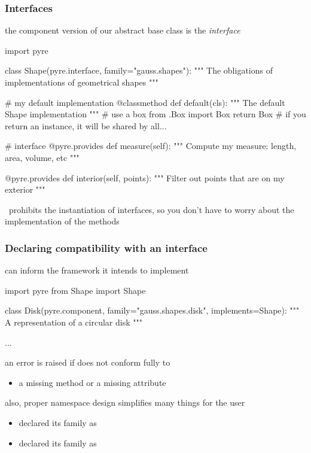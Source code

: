 \begin{frame}[fragile]
%
  \frametitle{Interfaces}
%
  the component version of our abstract base class is the \emph{interface}
%
  \begin{ipython}[basicstyle=\tt\tiny]{}
import pyre

class Shape(pyre.interface, family="gauss.shapes"):
    """
    The obligations of implementations of geometrical shapes
    """

    # my default implementation
    @classmethod
    def default(cls):
        """
        The default {Shape} implementation
        """
        # use a box
        from .Box import Box
        return Box # if you return an instance, it will be shared by all...

    # interface
    @pyre.provides
    def measure(self):
        """
        Compute my measure: length, area, volume, etc
        """
        
    @pyre.provides
    def interior(self, points):
        """
        Filter out {points} that are on my exterior
        """
  \end{ipython}
%
  \pyre\ prohibits the instantiation of interfaces, so you don't have to worry about the
  implementation of the methods
%
\end{frame}

\begin{frame}[fragile]
%
  \frametitle{Declaring compatibility with an interface}
%
   can inform the framework it intends to implement 
%
  \begin{ipython}{}
import pyre
from Shape import Shape

class Disk(pyre.component, family="gauss.shapes.disk", implements=Shape):
    """
    A representation of a circular disk
    """

    ...
  \end{ipython}
%
  an error is raised if  does not conform fully to 
%
  \begin{itemize}
  \item a missing method or a missing attribute
  \end{itemize}
%
  also, proper namespace design simplifies many things for the user
%
  \begin{itemize}
  \item {} declared its family as 
  \item {} declared its family as 
  \end{itemize}
%
\end{frame}


